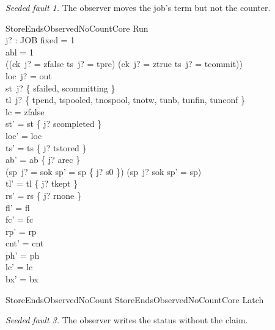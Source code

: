 \documentclass[a4paper,10pt,fleqn]{article}
\begin{document}
\emph{Seeded fault 1.} The observer moves the job's term but not the counter.

\begin{schema}{StoreEndsObservedNoCountCore}
\Delta Run \\ j? : JOB
\where
fixed = 1 \\
abl = 1 \\
((ck~j? = zfalse \land ts~j? = tpre) \lor (ck~j? = ztrue \land ts~j? = tcommit)) \\
loc~j? = out \\
st~j? \in \{ sfailed, scommitting \} \\
tl~j? \in \{ tpend, tspooled, tnospool, tnotw, tunb, tunfin, tunconf \} \\
lc = zfalse \\
st' = st \oplus \{ j? \mapsto scompleted \} \\
loc' = loc \\
ts' = ts \oplus \{ j? \mapsto tstored \} \\
ab' = ab \oplus \{ j? \mapsto arec \} \\
(sp~j? = sok \implies sp' = sp \oplus \{ j? \mapsto s0 \}) \land (sp~j? \neq sok \implies sp' = sp) \\
tl' = tl \oplus \{ j? \mapsto tkept \} \\
rs' = rs \oplus \{ j? \mapsto rnone \} \\
fl' = fl \\
fc' = fc \\
rp' = rp \\
cnt' = cnt \\
ph' = ph \\
lc' = lc \\
bx' = bx
\end{schema}

\begin{zed}
StoreEndsObservedNoCount  StoreEndsObservedNoCountCore \land Latch
\end{zed}

\emph{Seeded fault 3.} The observer writes the status without the claim.
\end{document}
